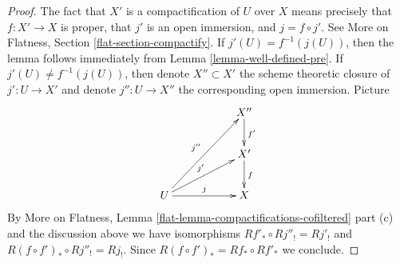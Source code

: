 \documentclass{stacks-project}
\theoremstyle{plain}
\theoremstyle{definition}
\theoremstyle{remark}
\numberwithin{equation}{subsection}
\begin{document}
\begin{proof}
The fact that $X'$ is a compactification of $U$ over $X$ means
precisely that $f : X' \to X$ is proper, that $j'$ is an open immersion,
and $j = f \circ j'$. See
More on Flatness, Section \ref{flat-section-compactify}.
If $j'(U) = f^{-1}(j(U))$, then the lemma follows immediately from
Lemma \ref{lemma-well-defined-pre}.
If $j'(U) \not = f^{-1}(j(U))$, then denote $X'' \subset X'$ the
scheme theoretic closure of $j' : U \to X'$ and denote
$j'' : U \to X''$ the corresponding open immersion.
Picture
$$
\xymatrix{
& & X'' \ar[d]^{f'} \\
& & X' \ar[d]^f \\
U \ar[rr]^j \ar[rru]^{j'} \ar[rruu]^{j''} & & X
}
$$
By
More on Flatness, Lemma \ref{flat-lemma-compactifications-cofiltered} part (c)
and the discussion above we have isomorphisms
$Rf'_* \circ Rj''_! = Rj'_!$ and $R(f \circ f')_* \circ Rj''_! = Rj_!$.
Since $R(f \circ f')_* = Rf_* \circ Rf'_*$ we conclude.
\end{proof}
\end{document}
